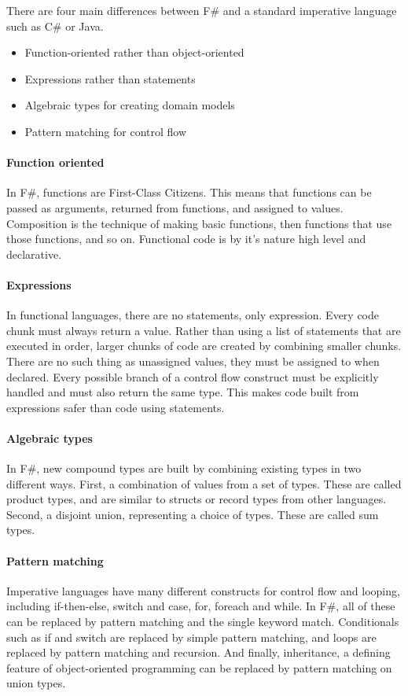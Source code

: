 \documentclass[12pt, a4paper]{article}
\begin{document}
There are four main differences between F\# and a standard imperative language such as C\# or Java.
\begin{itemize}
\item Function-oriented rather than object-oriented
\item Expressions rather than statements
\item Algebraic types for creating domain models
\item Pattern matching for control flow
\end{itemize}

\paragraph{Function oriented}
In F\#, functions are First-Class Citizens. This means that functions can be passed as arguments, returned from functions, and assigned to values. Composition is the technique of making basic functions, then functions that use those functions, and so on. Functional code is by it’s nature high level and declarative.

\paragraph{Expressions}
In functional languages, there are no statements, only expression. Every code chunk must always return a value. Rather than using a list of statements that are executed in order, larger chunks of code are created by combining smaller chunks. There are no such thing as unassigned values, they must be assigned to when declared. Every possible branch of a control flow construct must be explicitly handled and must also return the same type. This makes code built from expressions safer than code using statements.

\paragraph{Algebraic types}
In F\#, new compound types are built by combining existing types in two different ways. First, a combination of values from a set of types. These are called product types, and are similar to structs or record types from other languages. Second, a disjoint union, representing a choice of types. These are called sum types.

\paragraph{Pattern matching}
Imperative languages have many different constructs for control flow and looping, including if-then-else, switch and case, for, foreach and while. In F\#, all of these can be replaced by pattern matching and the single keyword match. Conditionals such as if and switch are replaced by simple pattern matching, and loops are replaced by pattern matching and recursion. And finally, inheritance, a defining feature of object-oriented programming can be replaced by pattern matching on union types.
\end{document}
